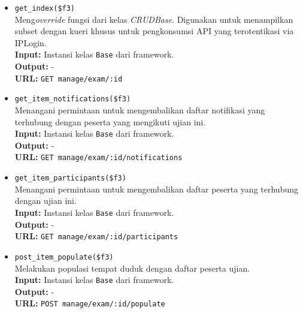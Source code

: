 \begin{itemize}
\begin{itemize}
                \item \texttt{get\_index(\$f3)} \\
                    Meng\textit{override} fungsi dari kelas \textit{CRUDBase}.
                    Digunakan untuk menampilkan subset dengan kueri khusus untuk
                    pengkonsumsi API yang terotentikasi via IPLogin.\\
                    \textbf{Input:} Instansi kelas \texttt{Base} dari
                    framework.\\
                    \textbf{Output:} -\\
                    \textbf{URL:} \texttt{GET manage/exam/:id}
                
                \item \texttt{get\_item\_notifications(\$f3)} \\
                    Menangani permintaan untuk mengembalikan daftar notifikasi
                    yang terhubung dengan peserta yang mengikuti ujian ini.\\
                    \textbf{Input:} Instansi kelas \texttt{Base} dari
                    framework.\\
                    \textbf{Output:} -\\
                    \textbf{URL:} \texttt{GET manage/exam/:id/notifications}
                
                \item \texttt{get\_item\_participants(\$f3)} \\
                    Menangani permintaan untuk mengembalikan daftar peserta yang
                    terhubung dengan ujian ini.\\
                    \textbf{Input:} Instansi kelas \texttt{Base} dari
                    framework.\\
                    \textbf{Output:} -\\
                    \textbf{URL:} \texttt{GET manage/exam/:id/participants}
                
                \item \texttt{post\_item\_populate(\$f3)} \\
                    Melakukan populasi tempat duduk dengan daftar peserta
                    ujian.\\
                    \textbf{Input:} Instansi kelas \texttt{Base} dari
                    framework.\\
                    \textbf{Output:} -\\
                    \textbf{URL:} \texttt{POST manage/exam/:id/populate}
                

\end{itemize}
\end{itemize}
